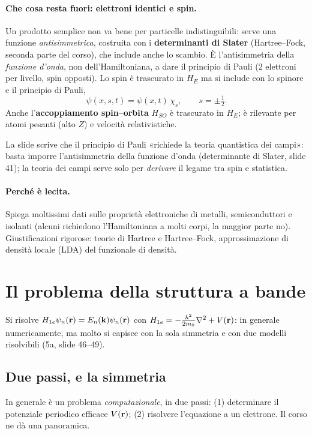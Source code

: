 \documentclass[11pt,a4paper]{article}
\begin{document}
\paragraph{Che cosa resta fuori: elettroni identici e spin.} Un prodotto semplice non va bene per particelle indistinguibili: serve una funzione
\emph{antisimmetrica}, costruita con i \textbf{determinanti di Slater} (Hartree--Fock, seconda parte del corso), che include anche lo scambio. È
l'antisimmetria della \emph{funzione d'onda}, non dell'Hamiltoniana, a dare il principio di Pauli (2 elettroni per livello, spin opposti). Lo spin è
trascurato in $H_E$ ma si include con lo spinore e il principio di Pauli,
\[
\psi(x,s,t)=\psi(x,t)\,\chi_s,\qquad s=\pm\tfrac12.
\]
Anche l'\textbf{accoppiamento spin--orbita} $H_{SO}$ è trascurato in $H_E$; è rilevante per atomi pesanti (alto $Z$) e velocità relativistiche.

\begin{osservazione}
La slide scrive che il principio di Pauli «richiede la teoria quantistica dei campi»: basta imporre l'antisimmetria della funzione d'onda (determinante
di Slater, slide 41); la teoria dei campi serve solo per \emph{derivare} il legame tra spin e statistica.
\end{osservazione}

\paragraph{Perché è lecita.} Spiega moltissimi dati sulle proprietà elettroniche di metalli, semiconduttori e isolanti (alcuni richiedono l'Hamiltoniana
a molti corpi, la maggior parte no). Giustificazioni rigorose: teorie di Hartree e Hartree--Fock, approssimazione di densità locale (LDA) del funzionale
di densità.

\section{Il problema della struttura a bande}\label{sec:problema}
Si risolve $H_{1e}\psi_n(\mathbf r)=E_n(\mathbf k)\psi_n(\mathbf r)$ con $H_{1e}=-\frac{\hbar^2}{2m_0}\nabla^2+V(\mathbf r)$: in generale numericamente, ma molto si capisce con
la sola simmetria e con due modelli risolvibili (5a, slide 46--49).

\subsection{Due passi, e la simmetria}
In generale è un problema \emph{computazionale}, in due passi: (1) determinare il potenziale periodico efficace $V(\mathbf r)$; (2) risolvere l'equazione a
un elettrone. Il corso ne dà una panoramica.
\end{document}
